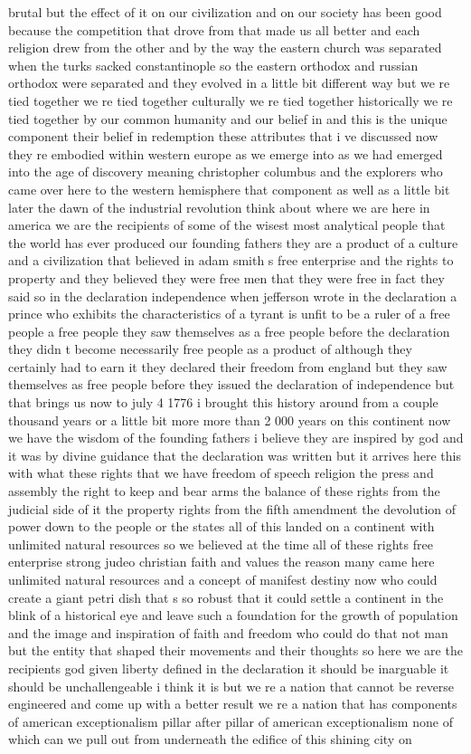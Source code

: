 \documentclass{article}
\begin{document}
brutal but the effect of it on our civilization and on our society has been good because the competition that drove from that made us all better and each religion drew from the other and by the way the eastern church was separated when the turks sacked constantinople so the eastern orthodox and russian orthodox were separated and they evolved in a little bit different way but we re tied together we re tied together culturally we re tied together historically we re tied together by our common humanity and our belief in and this is the unique component their belief in redemption these attributes that i ve discussed now they re embodied within western europe as we emerge into as we had emerged into the age of discovery meaning christopher columbus and the explorers who came over here to the western hemisphere that component as well as a little bit later the dawn of the industrial revolution think about where we are here in america we are the recipients of some of the wisest most analytical people that the world has ever produced our founding fathers they are a product of a culture and a civilization that believed in adam smith s free enterprise and the rights to property and they believed they were free men that they were free in fact they said so in the declaration independence when jefferson wrote in the declaration a prince who exhibits the characteristics of a tyrant is unfit to be a ruler of a free people a free people they saw themselves as a free people before the declaration they didn t become necessarily free people as a product of although they certainly had to earn it they declared their freedom from england but they saw themselves as free people before they issued the declaration of independence but that brings us now to july 4 1776 i brought this history around from a couple thousand years or a little bit more more than 2 000 years on this continent now we have the wisdom of the founding fathers i believe they are inspired by god and it was by divine guidance that the declaration was written but it arrives here this with what these rights that we have freedom of speech religion the press and assembly the right to keep and bear arms the balance of these rights from the judicial side of it the property rights from the fifth amendment the devolution of power down to the people or the states all of this landed on a continent with unlimited natural resources so we believed at the time all of these rights free enterprise strong judeo christian faith and values the reason many came here unlimited natural resources and a concept of manifest destiny now who could create a giant petri dish that s so robust that it could settle a continent in the blink of a historical eye and leave such a foundation for the growth of population and the image and inspiration of faith and freedom who could do that not man but the entity that shaped their movements and their thoughts so here we are the recipients god given liberty defined in the declaration it should be inarguable it should be unchallengeable i think it is but we re a nation that cannot be reverse engineered and come up with a better result we re a nation that has components of american exceptionalism pillar after pillar of american exceptionalism none of which can we pull out from underneath the edifice of this shining city on 
\end{document}
